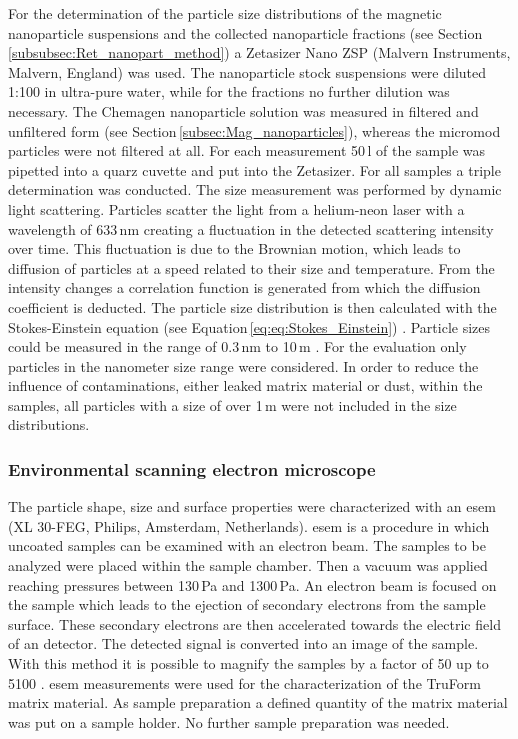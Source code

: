 For the determination of the particle size distributions of the magnetic nanoparticle suspensions and the collected nanoparticle fractions (see Section\,\ref{subsubsec:Ret_nanopart_method}) a Zetasizer Nano ZSP (Malvern Instruments, Malvern, England) was used. The nanoparticle stock suspensions were diluted 1:100 in ultra-pure water, while for the fractions no further dilution was necessary. The Chemagen nanoparticle solution was measured in filtered and unfiltered form (see Section\,\ref{subsec:Mag_nanoparticles}), whereas the micromod particles were not filtered at all. For each measurement 50\,\textmu l of the sample was pipetted into a quarz cuvette and put into the Zetasizer. For all samples a triple determination was conducted. The size measurement was performed by dynamic light scattering. Particles scatter the light from a helium-neon laser with a wavelength of 633\,nm creating a fluctuation in the detected scattering intensity over time. This fluctuation is due to the Brownian motion, which leads to diffusion of particles at a speed related to their size and temperature. From the intensity changes a correlation function is generated from which the diffusion coefficient is deducted. The particle size distribution is then calculated with the Stokes-Einstein equation (see Equation\,\ref{eq:eq:Stokes_Einstein}) \cite{berne2000dynamic}. Particle sizes could be measured in the range of 0.3\,nm to 10\,\textmu m \cite{Zetasizer}. For the evaluation only particles in the nanometer size range were considered. In order to reduce the influence of contaminations, either leaked matrix material or dust, within the samples, all particles with a size of over 1\,\textmu m were not included in the size distributions.

\subsubsection{Environmental scanning electron microscope}
\label{subsubsec:ESEM}
The particle shape, size and surface properties were characterized with an \gls{esem} (XL 30-FEG, Philips, Amsterdam, Netherlands). \gls{esem} is a procedure in which uncoated samples can be examined with an electron beam. The samples to be analyzed were placed within the sample chamber. Then a vacuum was applied reaching pressures between 130\,Pa and 1300\,Pa. An electron beam is focused on the sample which leads to the ejection of secondary electrons from the sample surface. These secondary electrons are then accelerated towards the electric field of an detector. The detected signal is converted into an image of the sample. With this method it is possible to magnify the samples by a factor of 50 up to 5100 \cite{danilatos1993introduction}.     
\gls{esem} measurements were used for the characterization of the TruForm matrix material. As sample preparation a defined quantity of the matrix material was put on a sample holder. No further sample preparation was needed.

